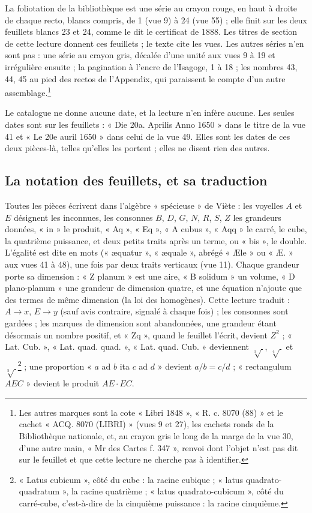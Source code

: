 \documentclass[11pt,a4paper]{article}
\begin{document}
La foliotation de la bibliothèque est une série au crayon rouge, en haut à
droite de chaque recto, blancs compris, de 1 (vue 9) à 24 (vue 55) ; elle finit
sur les deux feuillets blancs 23 et 24, comme le dit le certificat de 1888. Les
titres de section de cette lecture donnent ces feuillets ; le texte cite les
vues. Les autres séries n'en sont pas : une série au crayon gris, décalée d'une
unité aux vues 9 à 19 et irrégulière ensuite ; la pagination à l'encre de
l'Isagoge, 1 à 18 ; les nombres 43, 44, 45 au pied des rectos de l'Appendix,
qui paraissent le compte d'un autre assemblage.\footnote{Les autres marques
sont la cote « Libri 1848 », « R. c. 8070 (88) » et le cachet « ACQ. 8070
(LIBRI) » (vues 9 et 27), les cachets ronds de la Bibliothèque nationale, et,
au crayon gris le long de la marge de la vue 30, d'une autre main, « Mr des
Cartes f. 347 », renvoi dont l'objet n'est pas dit sur le feuillet et que cette
lecture ne cherche pas à identifier.}

Le catalogue ne donne aucune date, et la lecture n'en infère aucune. Les
seules dates sont sur les feuillets : « Die 20a. Aprilis Anno 1650 » dans le
titre de la vue 41 et « Le 20e auril 1650 » dans celui de la vue 49. Elles sont
les dates de ces deux pièces-là, telles qu'elles les portent ; elles ne disent
rien des autres.

\subsection*{La notation des feuillets, et sa traduction}

Toutes les pièces écrivent dans l'algèbre « spécieuse » de Viète : les voyelles
$A$ et $E$ désignent les inconnues, les consonnes $B$, $D$, $G$, $N$, $R$, $S$,
$Z$ les grandeurs données, « in » le produit, « Aq », « Eq », « A cubus »,
« Aqq » le carré, le cube, la quatrième puissance, et deux petits traits après
un terme, ou « bis », le double. L'égalité est dite en mots (« æquatur »,
« æquale », abrégé « Æle » ou « Æ. » aux vues 41 à 48), une fois par deux traits
verticaux (vue 11). Chaque grandeur porte sa dimension : « Z planum » est une
aire, « B solidum » un volume, « D plano-planum » une grandeur de dimension
quatre, et une équation n'ajoute que des termes de même dimension (la loi des
homogènes). Cette lecture traduit : $A \to x$, $E \to y$ (sauf avis contraire,
signalé à chaque fois) ; les consonnes sont gardées ; les marques de dimension
sont abandonnées, une grandeur étant désormais un nombre positif, et « Zq »,
quand le feuillet l'écrit, devient $Z^2$ ; « Lat. Cub. », « Lat. quad. quad. »,
« Lat. quad. Cub. » deviennent $\sqrt[3]{\ }$, $\sqrt[4]{\ }$ et
$\sqrt[5]{\ }$\footnote{« Latus cubicum », côté du cube : la racine cubique ;
« latus quadrato-quadratum », la racine quatrième ; « latus quadrato-cubicum »,
côté du carré-cube, c'est-à-dire de la cinquième puissance : la racine
cinquième.} ; une proportion « $a$ ad $b$ ita $c$ ad $d$ » devient
$a/b=c/d$ ; « rectangulum $AEC$ » devient le produit $AE\cdot EC$.
\end{document}
